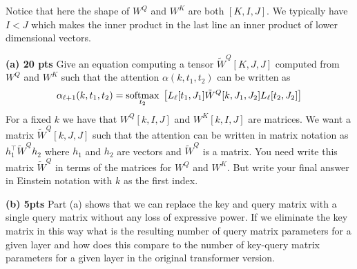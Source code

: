 \documentclass{article}
\newcommand{\solution}[1]{}
\begin{document}
Notice that here the shape of $W^Q$ and $W^K$ are both $[K,I,J]$.  We typically have $I < J$ which makes the inner product in the last line an inner product of lower dimensional vectors.

\medskip
{\bf(a) 20 pts} Give an equation computing a tensor $\tilde{W}^Q[K,J,J]$ computed from $W^Q$ and $W^K$ such that the attention $\alpha(k,t_1,t_2)$ can be written as
$$\alpha_{\ell+1}(k,t_1,t_2) = \operatorname*{softmax}_{t_2}\;\left[L_\ell[t_1,J_1]\tilde{W}^Q[k,J_1,J_2]L_\ell[t_2,J_2]\right]$$
For a fixed $k$ we have that $W^Q[k,I,J]$ and $W^K[k,I,J]$ are matrices.  We want a matrix $\tilde{W}^Q[k,J,J]$ such that the attention can be written in matrix notation as
$h_1^\top \tilde{W}^Q h_2$ where $h_1$ and $h_2$ are vectors and $\tilde{W}^Q$ is a matrix.
You need write this matrix $\tilde{W}^Q$ in terms of the matrices for $W^Q$ and $W^K$.  But write your final answer in Einstein notation with $k$ as the first index.

\solution{
  This is easier to do in vector-matrix notation for a fixed k.  But it can also be done entirely in Einstein notation:
  \begin{eqnarray*}
    & = & \softmax_{t_2} \left[\frac{1}{\sqrt{I}}\;(L_\ell(t_1,J_1)W^Q[k,I,J_1])\;\;(W^K[k,I,J_2]L_\ell(t_1,J_2))\right] \\
    & = & \softmax_{t_2} \left[\frac{1}{\sqrt{I}}\;\sum_{j_1,j_2,i} L_\ell(t_1,j_1)\;W^Q[k,i,j_1]\;W^K[k,i,j_2]\;L_\ell(t_1,j_2)\right] \\
    & = & \softmax_{t_2} \left[\sum_{j_1,j_2} L_\ell(t_1,j_1) \; \left(\frac{1}{\sqrt{I}}\; \sum_i \;W^Q[k,i,j_1])\;\;(W^K[k,i,j_2])\right) \;L_\ell(t_1,j_2)\right] \\
    & = & \softmax_{t_2} \left[\sum_{j_1,j_2} L_\ell(t_1,j_1) \; \tilde{W}^Q[k,j_1,j_2] \;L_\ell(t_1,j_2)\right] \\
        & = & \softmax_{t_2} \left[L_\ell(t_1,J_1) \; \tilde{W}^Q[k,J_1,J_2] \;L_\ell(t_1,J_2)\right] \\
    \\
    \tilde{W}^Q[k,j_1,j_2] & = & \frac{1}{\sqrt{I}}\;W^Q[k,I,j_1]W^k[k,I,j_2]
    \end{eqnarray*}
}

\medskip
{\bf (b) 5pts} Part (a) shows that we can replace the key and query matrix with a single query matrix without any loss of expressive power.  If we eliminate the key matrix in this way
what is the resulting number of query matrix parameters for a given layer and how does this compare to the number of key-query matrix parameters for a given layer in the original transformer version.
\end{document}
